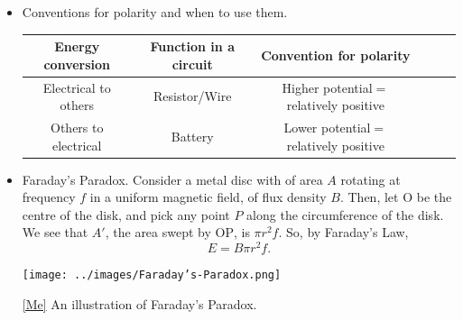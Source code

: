 \documentclass[oneside]{book}
\begin{document}
\begin{itemize}
\begin{center}
\begin{minipage}{0.9\textwidth}
            \captionsetup{type=figure}
            \caption[figure]{\ref{Lenz's Law} Example of motional emf.}
          \end{minipage}
    \end{center}
    \item Conventions for polarity and when to use them.
    \begin{center}
        \begin{tabular}{|Sc|Sc|Sc|}
            \hline
            Energy conversion & Function in a circuit & Convention for polarity\\
            \hline
            \textcolor{NavyBlue!80}{Electrical} to \textcolor{brown!70}{others} & Resistor/Wire & Higher potential\({}={}\)relatively positive\\
            \hline
            \textcolor{brown!70}{Others} to \textcolor{NavyBlue!80}{electrical} & Battery & Lower potential\({}={}\)relatively positive\\
            \hline
        \end{tabular}
    \end{center}
    \item Faraday's Paradox. Consider a metal disc with of area \(A\) rotating at frequency \(f\) in a uniform magnetic field, of flux density \(B\). Then, let \(\text{O}\) be the centre of the disk, and pick any point \(P\) along the circumference of the disk. We see that \(A'\), the area swept by \(\text{OP}\), is \(\pi r^2f\). So, by Faraday's Law,
    \[E=B\pi r^2f.\]
    \begin{center}
        \texttt{[image: ../images/Faraday’s-Paradox.png]}
        \captionsetup{type=figure}
        \caption[figure]{\ref{Me} An illustration of Faraday's Paradox.}
    \end{center}
\end{itemize}
\end{document}
